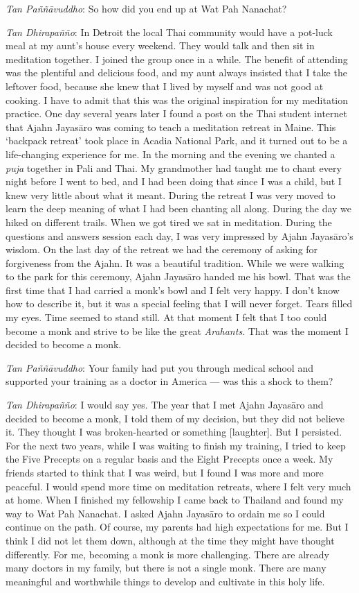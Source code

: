 \emph{Tan Paññāvuddho}‎: So how did you end up at Wat Pah Nanachat?

\emph{Tan Dhirapañño}‎: In Detroit the local Thai community would have a
pot-luck meal at my aunt's house every weekend. They would talk and then
sit in meditation together. I joined the group once in a while. The
benefit of attending was the plentiful and delicious food, and my aunt
always insisted that I take the leftover food, because she knew that I
lived by myself and was not good at cooking. I have to admit that this
was the original inspiration for my meditation practice. One day several
years later I found a post on the Thai student internet that Ajahn
Jayasāro was coming to teach a meditation retreat in Maine. This
`backpack retreat' took place in Acadia National Park, and it turned out
to be a life-changing experience for me. In the morning and the evening
we chanted a \emph{puja} together in Pali and Thai. My grandmother had
taught me to chant every night before I went to bed, and I had been
doing that since I was a child, but I knew very little about what it
meant. During the retreat I was very moved to learn the deep meaning of
what I had been chanting all along. During the day we hiked on different
trails. When we got tired we sat in meditation. During the questions and
answers session each day, I was very impressed by Ajahn Jayasāro's
wisdom. On the last day of the retreat we had the ceremony of asking for
forgiveness from the Ajahn. It was a beautiful tradition. While we were
walking to the park for this ceremony, Ajahn Jayasāro handed me his
bowl. That was the first time that I had carried a monk's bowl and I
felt very happy. I don't know how to describe it, but it was a special
feeling that I will never forget. Tears filled my eyes. Time seemed to
stand still. At that moment I felt that I too could become a monk and
strive to be like the great \emph{Arahants}. That was the moment I
decided to become a monk.

\emph{Tan Paññāvuddho}‎: Your family had put you through medical school
and supported your training as a doctor in America --- was this a shock
to them?

\emph{Tan Dhirapañño}‎: I would say yes. The year that I met Ajahn
Jayasāro and decided to become a monk, I told them of my decision, but
they did not believe it. They thought I was broken-hearted or something
{[}laughter{]}. But I persisted. For the next two years, while I was
waiting to finish my training, I tried to keep the Five Precepts on a
regular basis and the Eight Precepts once a week. My friends started to
think that I was weird, but I found I was more and more peaceful. I
would spend more time on meditation retreats, where I felt very much at
home. When I finished my fellowship I came back to Thailand and found my
way to Wat Pah Nanachat. I asked Ajahn Jayasāro to ordain me so I could
continue on the path. Of course, my parents had high expectations for
me. But I think I did not let them down, although at the time they might
have thought differently. For me, becoming a monk is more challenging.
There are already many doctors in my family, but there is not a single
monk. There are many meaningful and worthwhile things to develop and
cultivate in this holy life.

